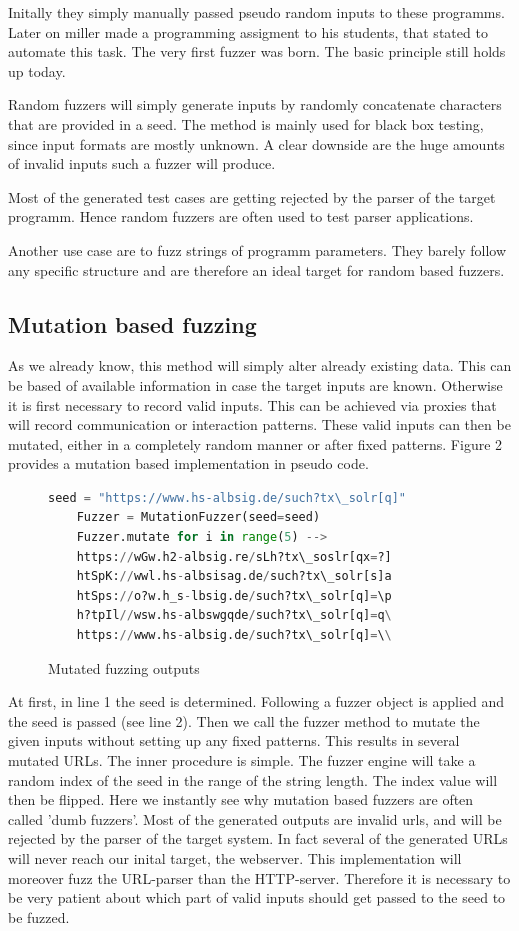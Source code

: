 \documentclass[journal=tosc,final]{iacrtrans}
\begin{document}
Initally they simply manually passed pseudo random inputs to these programms. Later on miller made a programming assigment to his students, that stated to automate this task. The very first fuzzer was born. The basic principle still holds up today. 

Random fuzzers will simply generate inputs by randomly concatenate characters that are provided in a seed. The method is mainly used for black box testing, since input formats are mostly unknown. A clear downside are the huge amounts of invalid inputs such a fuzzer will produce. 

Most of the generated test cases are getting rejected by the parser of the target programm. Hence random fuzzers are often used to test parser applications.

Another use case are to fuzz strings of programm parameters. They barely follow any specific structure and are therefore an ideal target for random based fuzzers. 
\subsection{Mutation based fuzzing}
As we already know, this method will simply alter already existing data. This can be based of available information in case the target inputs are known. Otherwise it is first necessary to record valid inputs. This can be achieved via proxies that will record communication or interaction patterns. These valid inputs can then be mutated, either in a completely random manner or after fixed patterns. Figure 2 provides a mutation based implementation in pseudo code. 

\begin{figure}[h]
\caption{Mutated fuzzing outputs}
 \begin{lstlisting}[language=python,style=code]
	seed = "https://www.hs-albsig.de/such?tx\_solr[q]"
	Fuzzer = MutationFuzzer(seed=seed)
	Fuzzer.mutate for i in range(5) -->
	https://wGw.h2-albsig.re/sLh?tx\_soslr[qx=?]
	htSpK://wwl.hs-albsisag.de/such?tx\_solr[s]a
	htSps://o?w.h_s-lbsig.de/such?tx\_solr[q]=\p
	h?tpIl//wsw.hs-albswgqde/such?tx\_solr[q]=q\
	https://www.hs-albsig.de/such?tx\_solr[q]=\\
\end{lstlisting}

\end{figure}
At first, in line 1 the seed is determined. Following a fuzzer object is applied and the seed is passed (see line 2). Then we call the fuzzer method to mutate the given inputs without setting up any fixed patterns. This results in several mutated URLs. The inner procedure is simple. The fuzzer engine will take a random index of the seed in the range of the string length. The index value will then be flipped.  Here we instantly see why mutation based fuzzers are often called 'dumb fuzzers'. 
Most of the generated outputs are invalid urls, and will be rejected by the parser of the target system. In fact several of the generated URLs will never reach our inital target, the webserver. This implementation will moreover fuzz the URL-parser than the HTTP-server.
Therefore it is necessary to be very patient about which part of valid inputs should get passed to the seed to be fuzzed. 
\end{document}
